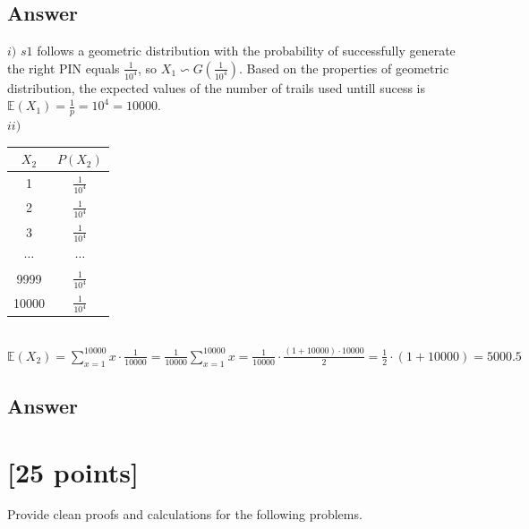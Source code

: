 \subsection{Answer}
 $i)$ $ s1 $ follows a geometric distribution with the probability of successfully generate the right PIN 
 equals $\frac{1}{10^4}$, so $X_1 \backsim G(\frac{1}{10^4})$. Based on the properties of geometric distribution, the expected values of the 
 number of trails used untill sucess is $\mathbb{E} (X_1) = \frac{1}{p} = 10^4 = 10000$. \\
 $ii)$  
 \begin{tabular}{c|c}
	$X_2$  & $P(X_2)$ \\
	\hline
	1 & $\frac{1}{10^4}$ \\
	2 & $\frac{1}{10^4}$ \\
	3 & $\frac{1}{10^4}$\\
	$\cdots$ & $\cdots$ \\
	9999 & $\frac{1}{10^4}$\\
	10000 & $\frac{1}{10^4}$ \\
	\end{tabular}
	\\
$\mathbb{E} (X_2) = \sum_{x=1}^{10000} x \cdot \frac{1}{10000} 
= \frac{1}{10000} \sum_{x=1}^{10000} x 
= \frac{1}{10000} \cdot \frac{(1+10000) \cdot 10000}{2} 
= \frac{1}{2} \cdot (1 + 10000) = 5000.5$

\subsection{Answer}






\newpage 

\section{ [25 points]} 
 

Provide clean proofs and calculations for the following problems. 

